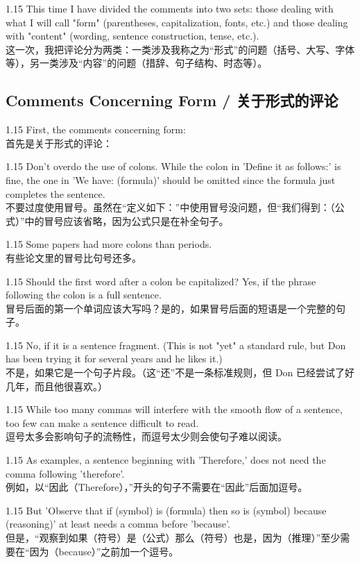 \documentclass[12pt,a4paper]{article}
\newcommand{\bilingual}[2]{
    \begin{spacing}{1.15} %
        \noindent \normalsize #1 \\[-0.5ex] %
        \small \textcolor{blue!70!black}{#2} %
    \end{spacing}
    \vspace{0.8em} %
}
\begin{document}
\bilingual{This time I have divided the comments into two sets: those dealing with what I will call "form" (parentheses, capitalization, fonts, etc.) and those dealing with "content" (wording, sentence construction, tense, etc.).}
{这一次，我把评论分为两类：一类涉及我称之为“形式”的问题（括号、大写、字体等），另一类涉及“内容”的问题（措辞、句子结构、时态等）。} %

\subsection*{Comments Concerning Form / 关于形式的评论} %

\bilingual{First, the comments concerning form:}
{首先是关于形式的评论：} %

\bilingual{Don't overdo the use of colons. While the colon in 'Define it as follows:' is fine, the one in 'We have: (formula)' should be omitted since the formula just completes the sentence.}
{不要过度使用冒号。虽然在“定义如下：”中使用冒号没问题，但“我们得到：（公式）”中的冒号应该省略，因为公式只是在补全句子。} %

\bilingual{Some papers had more colons than periods.}
{有些论文里的冒号比句号还多。} %

\bilingual{Should the first word after a colon be capitalized? Yes, if the phrase following the colon is a full sentence.}
{冒号后面的第一个单词应该大写吗？是的，如果冒号后面的短语是一个完整的句子。} %

\bilingual{No, if it is a sentence fragment. (This is not "yet" a standard rule, but Don has been trying it for several years and he likes it.)}
{不是，如果它是一个句子片段。（这“还”不是一条标准规则，但 Don 已经尝试了好几年，而且他很喜欢。）} %

\bilingual{While too many commas will interfere with the smooth flow of a sentence, too few can make a sentence difficult to read.}
{逗号太多会影响句子的流畅性，而逗号太少则会使句子难以阅读。} %

\bilingual{As examples, a sentence beginning with 'Therefore,' does not need the comma following 'therefore'.}
{例如，以“因此（Therefore），”开头的句子不需要在“因此”后面加逗号。} %

\bilingual{But 'Observe that if (symbol) is (formula) then so is (symbol) because (reasoning)' at least needs a comma before 'because'.}
{但是，“观察到如果（符号）是（公式）那么（符号）也是，因为（推理）”至少需要在“因为（because）”之前加一个逗号。} %
\end{document}
